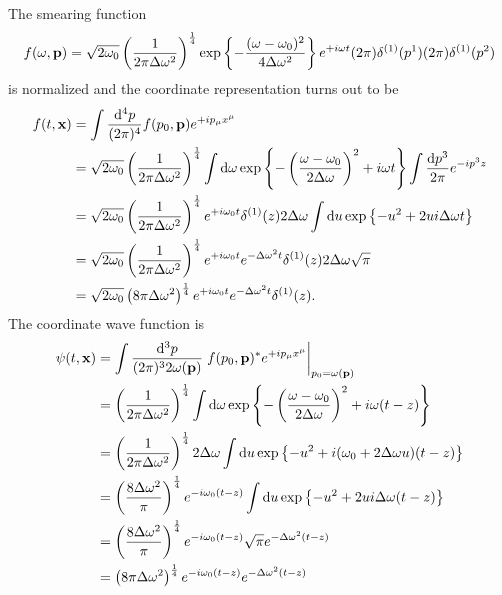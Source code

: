 \begin{example}
	The smearing function
	\begin{equation*}
		f(\omega,\vb{p})
		=
		\sqrt{2\omega_0}
		\left(\frac{1}{2\pi\Delta\omega^2}\right)^\frac{1}{4}
		\exp\left\{
			-
			\frac{(\omega-\omega_0)^2}{4\Delta\omega^2}
		\right\}
		e^{+i\omega t}
		(2\pi)\delta^{(1)}(p^1)
		(2\pi)\delta^{(1)}(p^2)
	\end{equation*}
	is normalized and the coordinate representation turns out to be
	\begin{equation*}
		\begin{split}
			f(t,\vb{x})
			&=
			\int\frac{\dd[4]{p}}{(2\pi)^4}
			f(p_0,\vb{p})
			e^{+ip_\mu x^\mu}
			\\
			&=
			\sqrt{2\omega_0}
			\left(\frac{1}{2\pi\Delta\omega^2}\right)^\frac{1}{4}
			\int\dd{\omega}
			\exp\left\{
				-
				\left(\frac{\omega-\omega_0}{2\Delta\omega}\right)^2
				+
				i\omega t
			\right\}
			\int\frac{\dd{p^3}}{2\pi}
			e^{-ip^3z}
			\\
			&=
			\sqrt{2\omega_0}
			\left(\frac{1}{2\pi\Delta\omega^2}\right)^\frac{1}{4}
			e^{+i\omega_0t}
			\delta^{(1)}(z)
			2\Delta\omega
			\int\dd{u}
			\exp\left\{
				-
				u^2
				+
				2u i\Delta\omega t
			\right\}
			\\
			&=
			\sqrt{2\omega_0}
			\left(\frac{1}{2\pi\Delta\omega^2}\right)^\frac{1}{4}
			e^{+i\omega_0t}
			e^{-\Delta\omega^2 t}
			\delta^{(1)}(z)
			2\Delta\omega
			\sqrt{\pi}
			\\
			&=
			\sqrt{2\omega_0}
			\left(8\pi\Delta\omega^2\right)^\frac{1}{4}
			e^{+i\omega_0t}
			e^{-\Delta\omega^2 t}
			\delta^{(1)}(z)
			.
		\end{split}
	\end{equation*}
	The coordinate wave function is
	\begin{equation*}
		\begin{split}
			\psi(t,\vb{x})
			&=
			\int\frac{\dd[3]{p}}{(2\pi)^32\omega(\vb{p})}
			\eval{
				f(p_0,\vb{p})^*
				e^{+ip_\mu x^\mu}
			}_{p_0=\omega(\vb{p})}
			\\
			&=
			\left(\frac{1}{2\pi\Delta\omega^2}\right)^\frac{1}{4}
			\int\dd{\omega}
			\exp\left\{
				-
				\left(\frac{\omega-\omega_0}{2\Delta\omega}\right)^2
				+
				i\omega(t-z)
			\right\}
			\\
			&=
			\left(\frac{1}{2\pi\Delta\omega^2}\right)^\frac{1}{4}
			2\Delta\omega
			\int\dd{u}
			\exp\left\{
				-
				u^2
				+
				i(\omega_0+2\Delta\omega u)(t-z)
			\right\}
			\\
			&=
			\left(\frac{8\Delta\omega^2}{\pi}\right)^\frac{1}{4}
			e^{-i\omega_0(t-z)}
			\int\dd{u}
			\exp\left\{
				-
				u^2
				+
				2u i\Delta\omega(t-z)
			\right\}
			\\
			&=
			\left(\frac{8\Delta\omega^2}{\pi}\right)^\frac{1}{4}
			e^{-i\omega_0(t-z)}
			\sqrt{\pi}
			e^{-\Delta\omega^2(t-z)}
			\\
			&=
			\left(8\pi\Delta\omega^2\right)^\frac{1}{4}
			e^{-i\omega_0(t-z)}
			e^{-\Delta\omega^2(t-z)}
		\end{split}
	\end{equation*}
\end{example}
